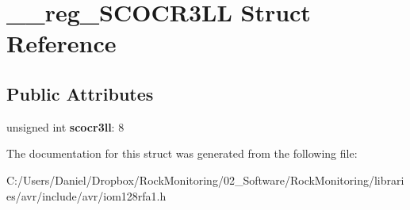 \hypertarget{struct____reg___s_c_o_c_r3_l_l}{}\section{\+\_\+\+\_\+reg\+\_\+\+S\+C\+O\+C\+R3\+LL Struct Reference}
\label{struct____reg___s_c_o_c_r3_l_l}
\subsection*{Public Attributes}
\begin{DoxyCompactItemize}
\item 
unsigned int {\bfseries scocr3ll}\+: 8\hypertarget{struct____reg___s_c_o_c_r3_l_l_ac334ca0679df97762ad3f5b576466cf7}{}\label{struct____reg___s_c_o_c_r3_l_l_ac334ca0679df97762ad3f5b576466cf7}

\end{DoxyCompactItemize}


The documentation for this struct was generated from the following file\+:\begin{DoxyCompactItemize}
\item 
C\+:/\+Users/\+Daniel/\+Dropbox/\+Rock\+Monitoring/02\+\_\+\+Software/\+Rock\+Monitoring/libraries/avr/include/avr/iom128rfa1.\+h\end{DoxyCompactItemize}
